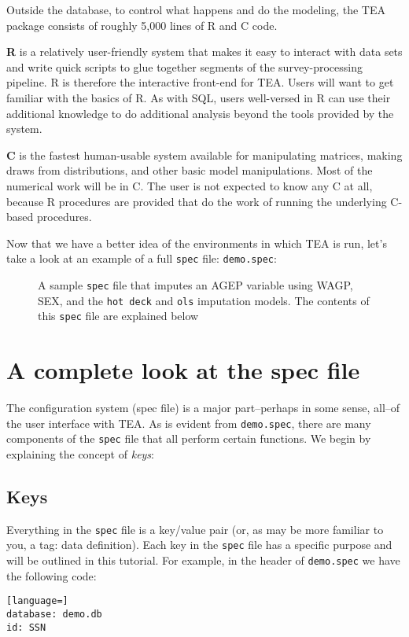 \documentclass{article}
\begin{document}
Outside the database, to control what happens and
do the modeling, the TEA package consists of roughly 5,000 lines of R and C code.

{\bf R} is a relatively user-friendly system that makes it easy to interact with data
sets and write quick scripts to glue together segments of the survey-processing pipeline.
R is therefore the interactive front-end for TEA. Users will want to get familiar with the basics of
R.  As with SQL, users well-versed in R can use their additional knowledge to do additional
analysis beyond the tools provided by the system.

{\bf C} is the fastest human-usable system available for manipulating matrices, making
draws from distributions, and other basic model manipulations. Most of the numerical
work will be in C. The user is not expected to know any C at all, because R procedures
are provided that do the work of running the underlying C-based procedures.

Now that we have a better idea of the environments in which TEA is run, let's take a look  
at an example of a full {\tt spec} file: {\tt demo.spec}:

\begin{figure}
\lstset{columns=fullflexible}
\caption{A sample {\tt spec} file that imputes an AGEP variable using WAGP, SEX, 
and the {\tt hot deck} and {\tt ols} imputation models. The contents of this {\tt spec} 
file are explained below}
\end{figure}

\section{A complete look at the spec file}
The configuration system (spec file) is a major part--perhaps in some sense, all--of 
the user interface with TEA.
As is evident from {\tt demo.spec}, there are many components of the {\tt spec} 
file that all perform certain functions. We begin by explaining the concept of {\it keys}:

\subsection{Keys}
Everything in the {\tt spec} file is a key/value pair (or, as may be more familiar to 
you, a tag: data definition). Each key in the {\tt spec} file has a specific purpose and 
will be outlined in this tutorial.
For example, in the header of {\tt demo.spec} we have the following code:
\begin{lstlisting}[language=]
database: demo.db
id: SSN
\end{lstlisting}
\end{document}
